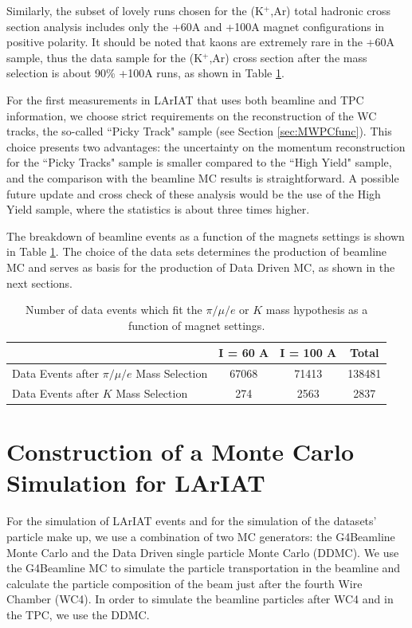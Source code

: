 Similarly, the subset of lovely runs chosen  for the (K$^{+}$,Ar)  total hadronic cross section analysis includes only the +60A and +100A magnet configurations in positive polarity. It should be noted that kaons are extremely rare in the +60A sample, thus the data sample for the (K$^{+}$,Ar) cross section after the mass selection is about 90\% +100A runs, as shown in Table \ref{tab:databreakdown}.

For the first measurements in LArIAT that uses both beamline and TPC information, we choose strict requirements on the reconstruction of the WC tracks, the so-called ``Picky Track" sample (see Section \ref{sec:MWPCfunc}). This choice presents two advantages:  the uncertainty on the momentum reconstruction for the ``Picky Tracks" sample is smaller compared to the ``High Yield" sample, and the comparison with the beamline MC results is straightforward. A possible future update and cross check of these analysis would be the use of the High Yield sample, where the statistics is about three times higher. 

The breakdown of beamline events as a function of the magnets settings is shown in Table \ref{tab:databreakdown}. 
The choice of the data sets determines the production of beamline MC and serves as basis for the production of Data Driven MC, as shown in the next sections.

\begin{table}[b]
\centering
\begin{tabular}{|l|c|c|c|}  
\hline
                                                              & I = 60 A          & I = 100 A   & Total     \\ \hline
Data Events after $\pi/\mu/e$ Mass Selection     &     67068          &  71413  & 138481 \\ \hline
Data Events after $K$ Mass Selection                &     274              &   2563   & 2837  \\ \hline
\end{tabular}
\caption{Number of data events which fit the $\pi/\mu/e$ or $K$ mass hypothesis as a function of magnet settings.}
\label{tab:databreakdown}
\end{table}



\section{Construction of a Monte Carlo Simulation for LArIAT}\label{sec:MCSet}
For the simulation of LArIAT events and for the simulation of the datasets' particle make up, we use a combination of two MC generators: the G4Beamline Monte Carlo and the Data Driven single particle Monte Carlo (DDMC). We use the G4Beamline MC to simulate the particle transportation in the beamline and calculate the particle composition of the beam just after the fourth Wire Chamber (WC4). In order to simulate the beamline particles after WC4 and in the TPC, we use the DDMC.

